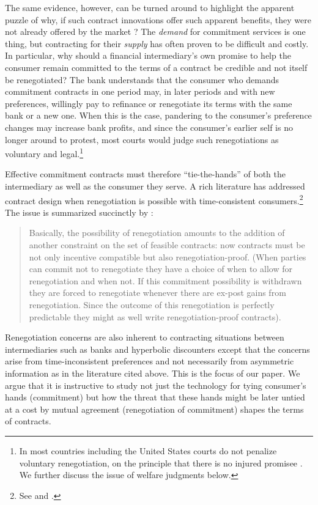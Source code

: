 \documentclass[11pt,english]{article}
\theoremstyle{plain}
\theoremstyle{definition}
\begin{document}
The same evidence, however, can be turned around to highlight the apparent puzzle
of why, if such contract innovations offer such
apparent benefits, they were not already offered by the market \citep[on this, see also][]{laibson2015}?
The \textit{demand} for commitment services is one thing, but contracting
for their \textit{supply} has often proven to be difficult and costly. In
particular, why should a financial intermediary's own promise to help
the consumer remain committed to the terms of a contract be credible
and not itself be renegotiated? The bank understands that the consumer
who demands commitment contracts in one period may, in later periods
and with new preferences, willingly pay to refinance or renegotiate
its terms \textendash{} with the same bank or a new one. When this
is the case, pandering to the consumer's preference changes may increase
bank profits, and since the consumer's earlier self is no longer around to protest,  most courts would judge such renegotiations as voluntary and legal.\footnote{In most countries including the United States courts do not penalize
voluntary renegotiation, on the principle that there is no injured
promisee \citep[see discussion in][p448]{laibson1997}. We further discuss the issue of welfare judgments below.}

Effective commitment contracts must therefore ``tie-the-hands''
of both the intermediary as well as the consumer they serve. A rich
literature has addressed contract design when renegotiation is possible with time-consistent consumers.\footnote{See \citet{hart1988,dewatripont1989,bolton1990} and \citet{rubinstein1992}.}
The issue is  summarized succinctly by \citet[p303]{bolton1990}:
\begin{quote}
Basically, the possibility of renegotiation amounts to the addition
of another constraint on the set of feasible contracts: now contracts
must be not only incentive compatible but also renegotiation-proof.
(When parties can commit not to renegotiate they have a choice of
when to allow for renegotiation and when not. If this commitment possibility
is withdrawn they are forced to renegotiate whenever there are ex-post
gains from renegotiation. Since the outcome of this renegotiation
is perfectly predictable they might as well write renegotiation-proof
contracts).
\end{quote}
Renegotiation concerns are also inherent to contracting situations between
intermediaries such as banks and hyperbolic discounters except that the concerns
arise from time-inconsistent preferences
and not necessarily from asymmetric information as in the literature cited above. This is the focus of our paper.
We argue that it is instructive
to study not just the technology for tying consumer's hands (commitment)
but how the threat that these hands might be later untied at a cost by mutual agreement
(renegotiation of commitment) shapes the terms of contracts.
\end{document}
